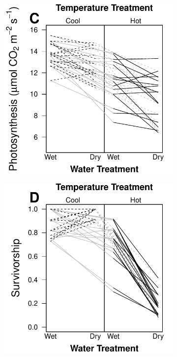 \documentclass[11pt, oneside]{article}
\begin{document}
\begin{figure}
\begin{subfigure}{.4\textwidth}
        \label{fig:FigS_SERrxnNorm}
    \end{subfigure} %
    \begin{subfigure}{0.4\textwidth}
        \centering
        \includegraphics[width=\linewidth]{Figures/FigureS_PhotoRxnNorm.pdf}
        \label{fig:FigS_PhotoRxnNorm}
    \end{subfigure}
    \begin{subfigure}{0.4\textwidth}
        \centering
        \includegraphics[width=\linewidth]{Figures/FigureS_MortRxnNorm.pdf}

\end{subfigure}
\end{figure}
\end{document}
